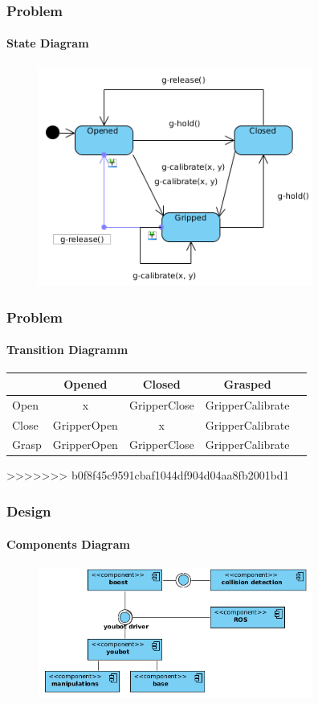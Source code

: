 \documentclass{beamer}
\begin{document}


\begin{frame}
 \frametitle{Problem}
 \framesubtitle{State Diagram}

 \begin{figure}[ht!]
  \centering
  \includegraphics[width=90mm]{img/statechart.png}
  \caption{}
  \label{State Diagram Of The Gripper}
  \end{figure} 
 \end{frame}
 
 
 \begin{frame}
 \frametitle{Problem}
 \framesubtitle{Transition Diagramm}
 \begin{tabular}{ l | c c c c }
            & Opened & Closed & Grasped \\ \hline
  Open      & x & GripperClose & GripperCalibrate \\
  Close     & GripperOpen & x  & GripperCalibrate \\
  Grasp     & GripperOpen & GripperClose & GripperCalibrate \\
  
\end{tabular}
>>>>>>> b0f8f45c9591cbaf1044df904d04aa8fb2001bd1

\end{frame}

\begin{frame}
 \frametitle{Design}
 \framesubtitle{Components Diagram}
  \begin{figure}[ht!]
  \centering
  \includegraphics[width=90mm]{img/components.png}
  \caption{}
  \label{Component Diagram}
  \end{figure} 
\end{frame}
\end{document}
